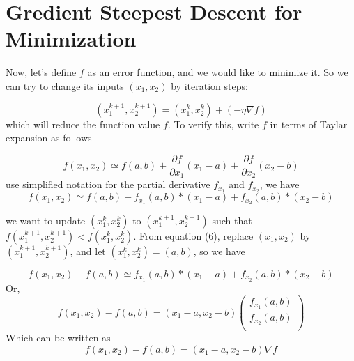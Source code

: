 \documentclass[conference]{IEEEtran}
\begin{document}
\section{Gredient Steepest Descent for Minimization}

Now, let's define $f$ as an error function, and
we would like to minimize it. So we can try to 
change its inputs $(x_1,x_2)$ by iteration steps: 

\begin{equation}
(x_1^{k+1}, x_2^{k+1}) =
(x_1^k, x_2^k) + (- \eta \nabla f)   
\end{equation}
which will reduce the function value $f$. 
To verify this, write $f$ in terms of Taylar 
expansion as follows 

\begin{equation}
f(x_1,x_2) \simeq f(a,b) + 
\frac{ \partial f} { \partial x_1 } (x_1 - a) 
+
\frac{ \partial f} { \partial x_2 } (x_2 - b)  
\end{equation}
use simplified notation for the partial derivative
$f_{x_1}$ and $f_{x_2}$, we have 
\begin{equation}
f(x_1,x_2) \simeq f(a,b) + 
f_{x_1}(a,b) * (x_1 - a) 
+
f_{x_2}(a,b) * (x_2 - b)  
\end{equation}

we want to update $(x_1^k, x_2^k)$ to 
$(x_1^{k+1}, x_2^{k+1})$ such that
$f(x_1^{k+1}, x_2^{k+1}) < f(x_1^k, x_2^k)$. 
From equation (6), replace  
$(x_1, x_2)$ by $(x_1^{k+1}, x_2^{k+1})$, and 
let $(x_1^k, x_2^k) = (a,b)$, so we have  
 
\begin{equation}
f(x_1,x_2) - f(a,b) \simeq  
f_{x_1}(a,b) * (x_1 - a) 
+
f_{x_2}(a,b) * (x_2 - b) 
\end{equation}
Or, 
\begin{equation}
f(x_1,x_2) - f(a,b)
= (x_1 - a, x_2 - b) 
\left(\begin{array}{c} 
f_{x_1}(a,b) \\ 
f_{x_2}(a,b) \\ 
\end{array}\right)
\end{equation}
Which can be written as 
\begin{equation}
f(x_1,x_2) - f(a,b)
=(x_1 - a, x_2 - b) \nabla f 
\end{equation}
\end{document}
